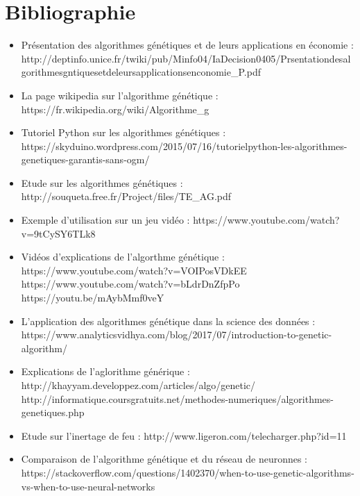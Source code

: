 \documentclass[a4paper,11pt]{article}
\begin{document}
	\section*{Bibliographie}
	\begin{itemize}
		\item Présentation des algorithmes génétiques et de leurs applications en économie : 
		\newline
		http://deptinfo.unice.fr/twiki/pub/Minfo04/IaDecision0405/Prsentationdesalgorithmesgntiquesetdeleursapplicationsenconomie\_P.pdf

		\item La page wikipedia sur l'algorithme génétique : 
		\newline
		https://fr.wikipedia.org/wiki/Algorithme\_g%

		\item Tutoriel Python sur les algorithmes génétiques :
		\newline
		https://skyduino.wordpress.com/2015/07/16/tutorielpython-les-algorithmes-genetiques-garantis-sans-ogm/

		\item Etude sur les algorithmes génétiques :
		\newline
		http://souqueta.free.fr/Project/files/TE\_AG.pdf
		
		\item Exemple d'utilisation sur un jeu vidéo :
		\newline
		https://www.youtube.com/watch?v=9tCySY6TLk8

		\item Vidéos d'explications de l'algorthme génétique : 
		\newline
		https://www.youtube.com/watch?v=VOIPosVDkEE
		https://www.youtube.com/watch?v=bLdrDnZfpPo
		https://youtu.be/mAybMmf0veY

		\item L'application des algorithmes génétique dans la science des données :
		\newline
		https://www.analyticsvidhya.com/blog/2017/07/introduction-to-genetic-algorithm/ 


		\item Explications de l’aglorithme générique :
		\newline
		http://khayyam.developpez.com/articles/algo/genetic/
		http://informatique.coursgratuits.net/methodes-numeriques/algorithmes-genetiques.php

		\item Etude sur l'inertage de feu :
		\newline
		http://www.ligeron.com/telecharger.php?id=11

		\item Comparaison de l'algorithme génétique et du réseau de neuronnes :
		\newline
		https://stackoverflow.com/questions/1402370/when-to-use-genetic-algorithms-vs-when-to-use-neural-networks
	\end{itemize}
	
\end{document}
